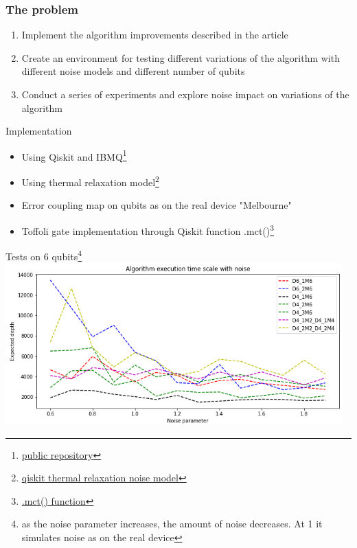 \documentclass[14pt,aspectratio=169,hyperref={pdftex,unicode},xcolor=dvipsnames]{beamer}
\begin{document}
\begin{frame}
\frametitle{The problem}
\begin{enumerate}
\item Implement the algorithm improvements described in the article
\item Create an environment for testing different variations of the algorithm with different noise models and different number of qubits
\item Conduct a series of experiments and explore noise impact on variations of the algorithm
\end{enumerate}
\end{frame}

\begin{frame}{Implementation}
	\begin{itemize}
		\item Using Qiskit and IBMQ\footnote{\href{https://github.com/StudioShader/QPSA}{public repository}}
		\item Using thermal relaxation  model\footnote{\href{https://github.com/Qiskit/qiskit-tutorials/blob/master/tutorials/simulators/3_building_noise_models.ipynb}{qiskit thermal relaxation noise model}}
		\item Error coupling map on qubits as on the real device "Melbourne"
		\item Toffoli gate implementation through Qiskit function .mct()\footnote{\href{https://qiskit.org/documentation/stubs/qiskit.circuit.QuantumCircuit.mct.html}{.mct() function}}
	\end{itemize}
\end{frame}

\begin{frame}{Tests on 6 qubits\footnote{as the noise parameter increases, the amount of noise decreases. At 1 it simulates noise as on the real device}}
	\includegraphics[width=13cm]{images/6_qubit_tests_.png}
\end{frame}
\end{document}
